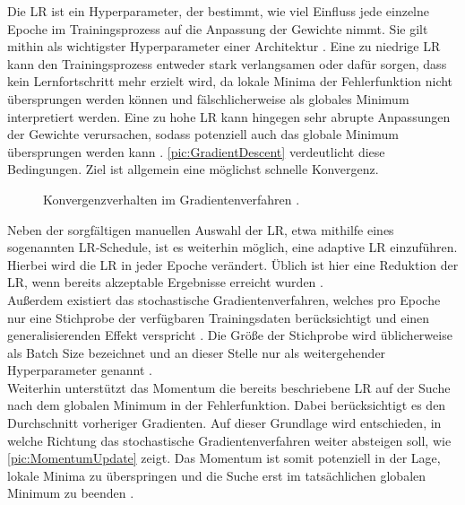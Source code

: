 \noindent
Die \ac{LR} ist ein Hyperparameter, der bestimmt, wie viel Einfluss jede einzelne Epoche im Trainingsprozess auf die Anpassung der Gewichte nimmt. Sie gilt mithin als wichtigster Hyperparameter einer Architektur \cite[S.~428]{ZHA20}. Eine zu niedrige \ac{LR} kann den Trainingsprozess entweder stark verlangsamen oder dafür sorgen, dass kein Lernfortschritt mehr erzielt wird, da lokale Minima der Fehlerfunktion nicht übersprungen werden können und fälschlicherweise als globales Minimum interpretiert werden. Eine zu hohe \ac{LR} kann hingegen sehr abrupte Anpassungen der Gewichte verursachen, sodass potenziell auch das globale Minimum übersprungen werden kann \cite[S.~414-415]{ZHA20}. \autoref{pic:GradientDescent} verdeutlicht diese Bedingungen. Ziel ist allgemein eine möglichst schnelle Konvergenz.\\

\begin{figure}[h!]
  \centering
  \caption{Konvergenzverhalten im Gradientenverfahren \cite[S.~429]{ZHA20}.}
  \label{pic:GradientDescent}
\end{figure}
\newpage

\noindent
Neben der sorgfältigen manuellen Auswahl der \ac{LR}, etwa mithilfe eines sogenannten \ac{LR}-Schedule, ist es weiterhin möglich, eine adaptive \ac{LR} einzuführen. Hierbei wird die \ac{LR} in jeder Epoche verändert. Üblich ist hier eine Reduktion der \ac{LR}, wenn bereits akzeptable Ergebnisse erreicht wurden \cite[S.~433]{ZHA20}.\\

\noindent
Außerdem existiert das stochastische Gradientenverfahren, welches pro Epoche nur eine Stichprobe der verfügbaren Trainingsdaten berücksichtigt und einen generalisierenden Effekt verspricht \cite[S.~437]{ZHA20}. Die Größe der Stichprobe wird üblicherweise als Batch Size bezeichnet und an dieser Stelle nur als weitergehender Hyperparameter genannt \cite[S.~446]{ZHA20}.\\

\noindent
Weiterhin unterstützt das Momentum die bereits beschriebene \ac{LR} auf der Suche nach dem globalen Minimum in der Fehlerfunktion. Dabei berücksichtigt es den Durchschnitt vorheriger Gradienten. Auf dieser Grundlage wird entschieden, in welche Richtung das stochastische Gradientenverfahren weiter absteigen soll, wie \autoref{pic:MomentumUpdate} zeigt. Das Momentum ist somit potenziell in der Lage, lokale Minima zu überspringen und die Suche erst im tatsächlichen globalen Minimum zu beenden \cite[S.~453-456]{ZHA20}.\\

